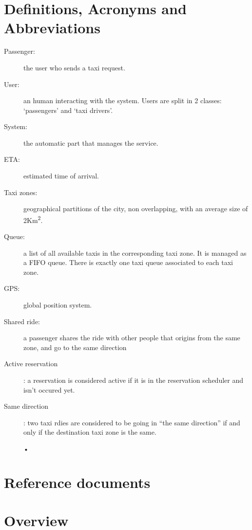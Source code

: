 \section{Definitions, Acronyms and Abbreviations}
\begin{description}
  \item[Passenger:] the user who sends a taxi request.
  \item[User:] an human interacting with the system. Users are split in 2 classes: `passengers' and `taxi drivers'.
  \item[System:] the automatic part that manages the service.
  \item[ETA:] estimated time of arrival.
  \item[Taxi zones:] geographical partitions of the city, non overlapping, with an average size of 2Km\textsuperscript{2}.
  \item[Queue:] a list of all available taxis in the corresponding taxi zone. It is managed as a FIFO queue.
    There is exactly one taxi queue associated to each taxi zone.
  \item[GPS:] global position system.
  \item[Shared ride:] a passenger shares the ride with other people that origins from the same zone, and go to the same direction
  \item[Active reservation]: a reservation is considered active if it is in the reservation scheduler and isn't occured yet.
  \item[Same direction]: two taxi rdies are considered to be going in ``the same direction'' if and only if the destination taxi zone
  is the same.
    \begin{center}
    •
    \end{center}
\end{description}


\section{Reference documents}


\section{Overview}

